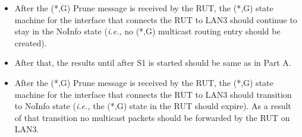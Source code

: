 \documentclass[11pt]{report}
\newcommand{\ie}{\emph{i.e.,}\xspace}
\begin{document}

\begin{itemize}

  \item After the (*,G) Prune message is received by the RUT,
  the (*,G) state machine for the interface that connects the RUT to
  LAN3 should continue to stay in the NoInfo state (\ie no (*,G) multicast
  routing entry should be created).

  \item After that, the results until after S1 is started should be same as in
  Part A.

  \item After the (*,G) Prune message is received by the RUT,
  the (*,G) state machine for the interface that connects the RUT to
  LAN3 should transition to NoInfo state
  (\ie the (*,G) state in the RUT should expire).
  As a result of that transition no multicast packets should be
  forwarded by the RUT on LAN3.

\end{itemize}

\end{document}
